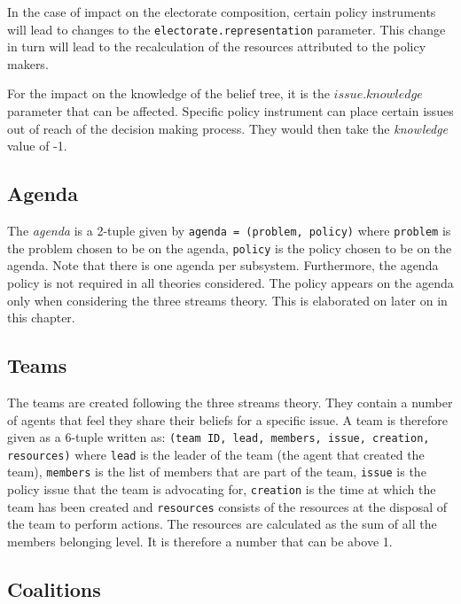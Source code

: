 \begin{enumerate}
In the case of impact on the electorate composition, certain policy instruments will lead to changes to the \texttt{electorate.representation} parameter. This change in turn will lead to the recalculation of the resources attributed to the policy makers.

For the impact on the knowledge of the belief tree, it is the $issue.knowledge$ parameter that can be affected. Specific policy instrument can place certain issues out of reach of the decision making process. They would then take the \emph{knowledge} value of -1.
\end{enumerate}



\subsection{Agenda}

The \emph{agenda} is a 2-tuple given by \texttt{agenda = (problem, policy)} where \texttt{problem} is the problem chosen to be on the agenda, \texttt{policy} is the policy chosen to be on the agenda. Note that there is one agenda per subsystem. Furthermore, the agenda policy is not required in all theories considered. The policy appears on the agenda only when considering the three streams theory. This is elaborated on later on in this chapter.

\subsection{Teams}

The teams are created following the three streams theory.  They contain a number of agents that feel they share their beliefs for a specific issue. A team is therefore given as a 6-tuple written as: \texttt{(team ID, lead, members, issue, creation, resources)} where \texttt{lead} is the leader of the team (the agent that created the team), \texttt{members} is the list of members that are part of the team, \texttt{issue} is the policy issue that the team is advocating for, \texttt{creation} is the time at which the team has been created and \texttt{resources} consists of the resources at the disposal of the team to perform actions. The resources are calculated as the sum of all the members belonging level. It is therefore a number that can be above 1.

\subsection{Coalitions}

